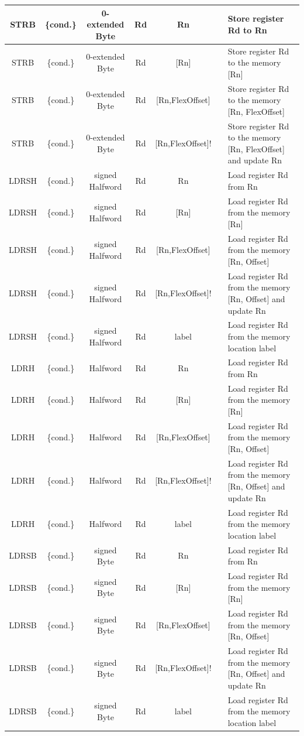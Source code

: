 {\begin{landscape}
\begin{tabular}{|c|c|c|c|c|c|l|}
\hline
\hline
STRB & \{cond.\} & 0-extended Byte & Rd & Rn &  & Store register Rd to Rn\\
\hline
STRB & \{cond.\} & 0-extended Byte & Rd & [Rn] &  & Store register Rd to the memory [Rn]\\
\hline
STRB & \{cond.\} & 0-extended Byte & Rd & [Rn,FlexOffset] &  & Store register Rd to the memory [Rn, FlexOffset]\\
\hline
STRB & \{cond.\} & 0-extended Byte & Rd & [Rn,FlexOffset]! &  & Store register Rd to the memory [Rn, FlexOffset] and update Rn\\
\hline
\hline
LDRSH & \{cond.\} & signed Halfword & Rd & Rn &  & Load register Rd from Rn\\
\hline
LDRSH & \{cond.\} & signed Halfword & Rd & [Rn] &  & Load register Rd from the memory [Rn]\\
\hline
LDRSH & \{cond.\} & signed Halfword & Rd & [Rn,FlexOffset] &  & Load register Rd from the memory [Rn, Offset]\\
\hline
LDRSH & \{cond.\} & signed Halfword & Rd & [Rn,FlexOffset]! &  & Load register Rd from the memory [Rn, Offset] and update Rn\\
\hline
LDRSH & \{cond.\} & signed Halfword & Rd & label &  & Load register Rd from the memory location label\\
\hline
\hline
LDRH & \{cond.\} & Halfword & Rd & Rn &  & Load register Rd from Rn\\
\hline
LDRH & \{cond.\} & Halfword & Rd & [Rn] &  & Load register Rd from the memory [Rn]\\
\hline
LDRH & \{cond.\} & Halfword & Rd & [Rn,FlexOffset] &  & Load register Rd from the memory [Rn, Offset]\\
\hline
LDRH & \{cond.\} & Halfword & Rd & [Rn,FlexOffset]! &  & Load register Rd from the memory [Rn, Offset] and update Rn\\
\hline
LDRH & \{cond.\} & Halfword & Rd & label &  & Load register Rd from the memory location label\\
\hline
\hline
LDRSB & \{cond.\} & signed Byte & Rd & Rn &  & Load register Rd from Rn\\
\hline
LDRSB & \{cond.\} & signed Byte & Rd & [Rn] &  & Load register Rd from the memory [Rn]\\
\hline
LDRSB & \{cond.\} & signed Byte & Rd & [Rn,FlexOffset] &  & Load register Rd from the memory [Rn, Offset]\\
\hline
LDRSB & \{cond.\} & signed Byte & Rd & [Rn,FlexOffset]! &  & Load register Rd from the memory [Rn, Offset] and update Rn\\
\hline
LDRSB & \{cond.\} & signed Byte & Rd & label &  & Load register Rd from the memory location label\\
\hline
\end{tabular}\\


\end{landscape}}
